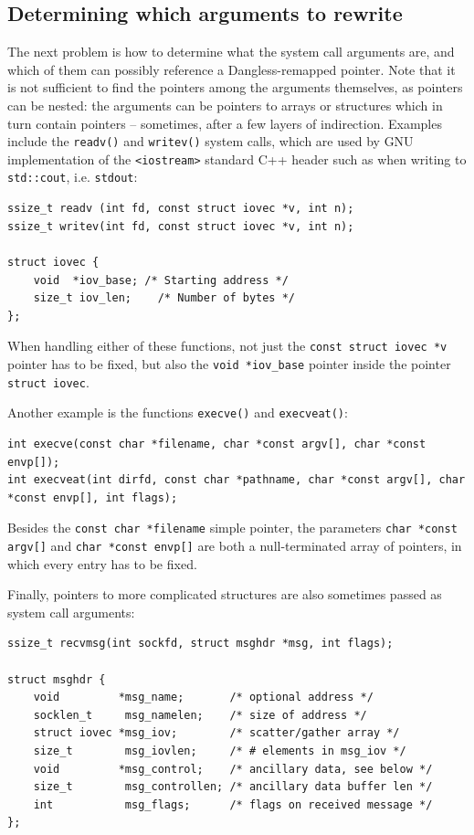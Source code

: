 \subsection{Determining which arguments to rewrite}

The next problem is how to determine what the system call arguments are, and which of them can possibly reference a Dangless-remapped pointer. Note that it is not sufficient to find the pointers among the arguments themselves, as pointers can be nested: the arguments can be pointers to arrays or structures which in turn contain pointers -- sometimes, after a few layers of indirection. Examples include the \lstinline!readv()! and \lstinline!writev()! system calls, which are used by GNU implementation of the \lstinline!<iostream>! standard C++ header such as when writing to \lstinline!std::cout!, i.e. \lstinline!stdout!:

\begin{lstlisting}
ssize_t readv (int fd, const struct iovec *v, int n);
ssize_t writev(int fd, const struct iovec *v, int n);

struct iovec {
	void  *iov_base; /* Starting address */
	size_t iov_len;    /* Number of bytes */
};
\end{lstlisting}

When handling either of these functions, not just the \lstinline!const struct iovec *v! pointer has to be fixed, but also the \lstinline!void *iov_base! pointer inside the pointer \lstinline!struct iovec!.

Another example is the functions \lstinline!execve()! and \lstinline!execveat()!:

\begin{lstlisting}
int execve(const char *filename, char *const argv[], char *const envp[]);
int execveat(int dirfd, const char *pathname, char *const argv[], char *const envp[], int flags);
\end{lstlisting}

Besides the \lstinline!const char *filename! simple pointer, the parameters \lstinline!char *const argv[]! and \lstinline!char *const envp[]! are both a null-terminated array of pointers, in which every entry has to be fixed.

Finally, pointers to more complicated structures are also sometimes passed as system call arguments:

\begin{lstlisting}
ssize_t recvmsg(int sockfd, struct msghdr *msg, int flags);

struct msghdr {
	void         *msg_name;       /* optional address */
	socklen_t     msg_namelen;    /* size of address */
	struct iovec *msg_iov;        /* scatter/gather array */
	size_t        msg_iovlen;     /* # elements in msg_iov */
	void         *msg_control;    /* ancillary data, see below */
	size_t        msg_controllen; /* ancillary data buffer len */
	int           msg_flags;      /* flags on received message */
};
\end{lstlisting}

